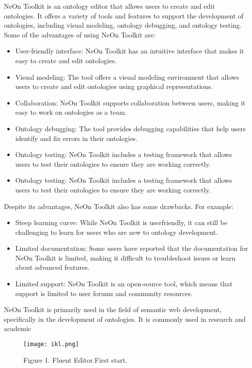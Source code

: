 \documentclass[a4paper,10pt,twocolumn]{article}
\begin{document}
NeOn Toolkit is an ontology editor that allows users
to create and edit ontologies. It offers a variety of tools
and features to support the development of ontologies,
including visual modeling, ontology debugging, and ontology
testing. Some of the advantages of using NeOn
Toolkit are:
\begin{itemize}
	\item{User-friendly interface: NeOn Toolkit has an intuitive
	interface that makes it easy to create and edit}
	ontologies.
	\item{Visual modeling: The tool offers a visual modeling
	environment that allows users to create and edit
	ontologies using graphical representations.}
	\item{Collaboration: NeOn Toolkit supports collaboration
	between users, making it easy to work on ontologies
	as a team.}
	\item{Ontology debugging: The tool provides debugging
	capabilities that help users identify and fix errors in
	their ontologies.}
	\item{Ontology testing: NeOn Toolkit includes a testing
	framework that allows users to test their ontologies
	to ensure they are working correctly.}
	\item{Ontology testing: NeOn Toolkit includes a testing
	framework that allows users to test their ontologies
	to ensure they are working correctly.}
\end{itemize}

Despite its advantages, NeOn Toolkit also has some
drawbacks. For example:
\begin{itemize}
\item{Steep learning curve: While NeOn Toolkit is userfriendly,
it can still be challenging to learn for users
who are new to ontology development.}
\item{Limited documentation: Some users have reported
that the documentation for NeOn Toolkit is limited,
making it difficult to troubleshoot issues or learn
about advanced features.}
\item{Limited support: NeOn Toolkit is an open-source
tool, which means that support is limited to user
forums and community resources.}
\end{itemize}
NeOn Toolkit is primarily used in the field of semantic
web development, specifically in the development of
ontologies. It is commonly used in research and academic
\begin{figure}[H]
	\centering
	\texttt{[image: ikl.png]}
	\caption*{\small{Figure 1. Fluent Editor.First start.}}
\end{figure} 
\end{document}
